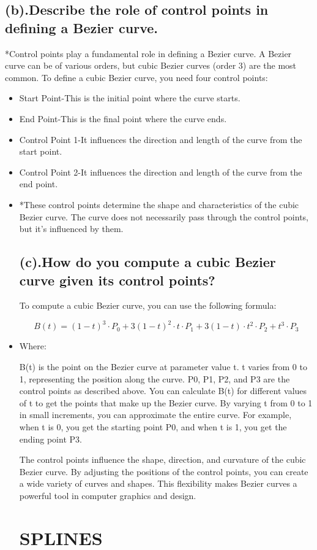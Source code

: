 \documentclass{article}
\begin{document}
\subsection{(b).Describe the role of control points in defining a Bezier curve.}
*Control points play a fundamental role in defining a Bezier curve. A Bezier curve can be of various orders, but cubic Bezier curves (order 3) are the most common. To define a cubic Bezier curve, you need four control points:
\begin{itemize}
\item Start Point-This is the initial point where the curve starts.
\item End Point-This is the final point where the curve ends.
\item Control Point 1-It influences the direction and length of the curve from the start point.
\item Control Point 2-It influences the direction and length of the curve from the end point.
\item *These control points determine the shape and characteristics of the cubic Bezier curve. The curve does not necessarily pass through the control points, but it's influenced by them.
\subsection{(c).How do you compute a cubic Bezier curve given its control points?}
To compute a cubic Bezier curve, you can use the following formula:

\[ B(t) = (1-t)^3 \cdot P_0 + 3(1-t)^2 \cdot t \cdot P_1 + 3(1-t) \cdot t^2 \cdot P_2 + t^3 \cdot P_3 \]
\item Where:

B(t) is the point on the Bezier curve at parameter value t.
t varies from 0 to 1, representing the position along the curve.
P0, P1, P2, and P3 are the control points as described above.
You can calculate B(t) for different values of t to get the points that make up the Bezier curve. By varying t from 0 to 1 in small increments, you can approximate the entire curve. For example, when t is 0, you get the starting point P0, and when t is 1, you get the ending point P3.

The control points influence the shape, direction, and curvature of the cubic Bezier curve. By adjusting the positions of the control points, you can create a wide variety of curves and shapes. This flexibility makes Bezier curves a powerful tool in computer graphics and design.
\section{SPLINES}

\end{itemize}
\end{document}
